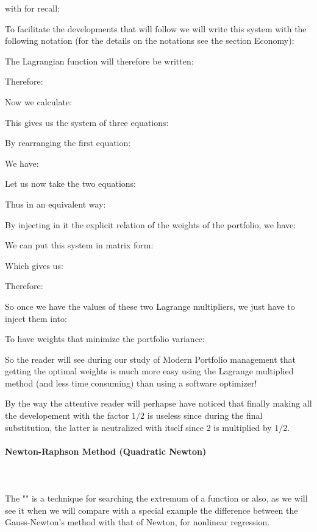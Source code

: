 	with for recall:
	
	To facilitate the developments that will follow we will write this system with the following notation (for the details on the notations see the section Economy):
	
	The Lagrangian function will therefore be written:
	 
	Therefore:
	 
 	Now we calculate:
	 
	This gives us the system of three equations:
	  
	By rearranging the first equation:
	 
 	We have:
	 
 	Let us now take the two equations:
	
	Thus in an equivalent way:
	
	By injecting in it the explicit relation of the weights of the portfolio, we have:
	
	We can put this system in matrix form:
	
	Which gives us:
	
	Therefore:
	
	So once we have the values of these two Lagrange multipliers, we just have to inject them into:
	
 	To have weights that minimize the portfolio variance:
	
	So the reader will see during our study of Modern Portfolio management that getting the optimal weights is much more easy using the Lagrange multiplied method (and less time consuming) than using a software optimizer!
	\begin{tcolorbox}[title=Remark,colframe=black,arc=10pt]
	By the way the attentive reader will perhapse have noticed that finally making all the developement with the factor $1/2$ is useless since during the final substitution, the latter is neutralized with itself since $2$ is multiplied by $1/2$.
	\end{tcolorbox}
	
	\pagebreak
	\paragraph{Newton-Raphson Method (Quadratic Newton)}\label{quadratic programming}\mbox{}\\\\
	The "\label{newton raphson method}" is a technique for searching the extremum of a function or also, as we will see it when we will compare with a special example the difference between the Gauss-Newton's method with that of Newton, for nonlinear regression.

